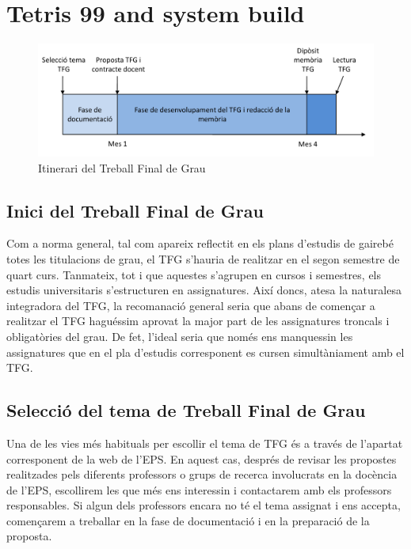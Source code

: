 
\chapter{Tetris 99 and system build}
\begin{figure}
\centering
\includegraphics[width=\linewidth]{Itinerari_TFG}
\caption{\label{fig:itinerari}Itinerari del Treball Final de Grau}
\end{figure}

\section{Inici del Treball Final de Grau}

Com a norma general, tal com apareix reflectit en els plans d'estudis de gairebé totes les titulacions de grau, el \ac{TFG} s'hauria de realitzar en el segon semestre de quart curs. Tanmateix, tot i que aquestes s'agrupen en cursos i semestres, els estudis universitaris s'estructuren en assignatures. Així doncs, atesa la naturalesa integradora del \ac{TFG}, la recomanació general seria que abans de començar a realitzar el \ac{TFG} haguéssim aprovat la major part de les assignatures troncals i obligatòries del grau. De fet, l'ideal seria que només ens manquessin les assignatures que en el pla d'estudis corresponent es cursen simultàniament amb el \ac{TFG}.

\section{Selecció del tema de Treball Final de Grau}

Una de les vies més habituals per escollir el tema de \ac{TFG} és a través de l'apartat corresponent de la web de l'\acf{EPS}. En aquest cas, després de revisar les propostes realitzades pels diferents professors o grups de recerca involucrats en la docència de l'\ac{EPS}, escollirem les que més ens interessin i contactarem amb els professors responsables. Si algun dels professors encara no té el tema assignat i ens accepta, començarem a treballar en la fase de documentació i en la preparació de la proposta.

